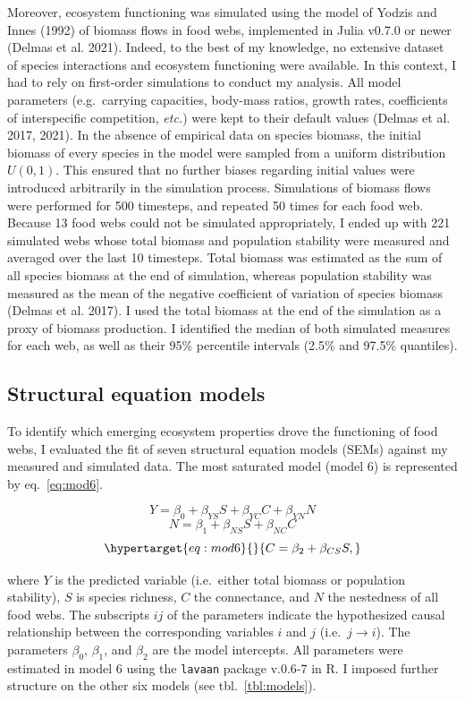 \documentclass[10pt,oneside]{article}
\begin{document}
Moreover, ecosystem functioning was simulated using the model of Yodzis
and Innes (1992) of biomass flows in food webs, implemented in Julia
v0.7.0 or newer (Delmas et al. 2021). Indeed, to the best of my
knowledge, no extensive dataset of species interactions and ecosystem
functioning were available. In this context, I had to rely on
first-order simulations to conduct my analysis. All model parameters
(e.g.~carrying capacities, body-mass ratios, growth rates, coefficients
of interspecific competition, \emph{etc.}) were kept to their default
values (Delmas et al. 2017, 2021). In the absence of empirical data on
species biomass, the initial biomass of every species in the model were
sampled from a uniform distribution \(U(0,1)\). This ensured that no
further biases regarding initial values were introduced arbitrarily in
the simulation process. Simulations of biomass flows were performed for
500 timesteps, and repeated 50 times for each food web. Because 13 food
webs could not be simulated appropriately, I ended up with 221 simulated
webs whose total biomass and population stability were measured and
averaged over the last 10 timesteps. Total biomass was estimated as the
sum of all species biomass at the end of simulation, whereas population
stability was measured as the mean of the negative coefficient of
variation of species biomass (Delmas et al. 2017). I used the total
biomass at the end of the simulation as a proxy of biomass production. I
identified the median of both simulated measures for each web, as well
as their 95\% percentile intervals (2.5\% and 97.5\% quantiles).

\hypertarget{structural-equation-models}{%
\subsection{Structural equation
models}\label{structural-equation-models}}

To identify which emerging ecosystem properties drove the functioning of
food webs, I evaluated the fit of seven structural equation models
(SEMs) against my measured and simulated data. The most saturated model
(model 6) is represented by eq.~\ref{eq:mod6}.

\[Y = \beta_0 + \beta_{YS}S + \beta_{YC}C + \beta_{YN}N\]
\[ N = \beta_1 + \beta_{NS}S + \beta_{NC}C\]
\begin{equation}\protect\hypertarget{eq:mod6}{}{ C = \beta_2 + \beta_{CS}S, }\label{eq:mod6}\end{equation}

where \(Y\) is the predicted variable (i.e.~either total biomass or
population stability), \(S\) is species richness, \(C\) the connectance,
and \(N\) the nestedness of all food webs. The subscripts \({ij}\) of
the parameters indicate the hypothesized causal relationship between the
corresponding variables \(i\) and \(j\) (i.e.~\(j \rightarrow i\)). The
parameters \(\beta_0\), \(\beta_1\), and \(\beta_2\) are the model
intercepts. All parameters were estimated in model 6 using the
\texttt{lavaan} package v.0.6-7 in R. I imposed further structure on the
other six models (see tbl.~\ref{tbl:models}).
\end{document}
